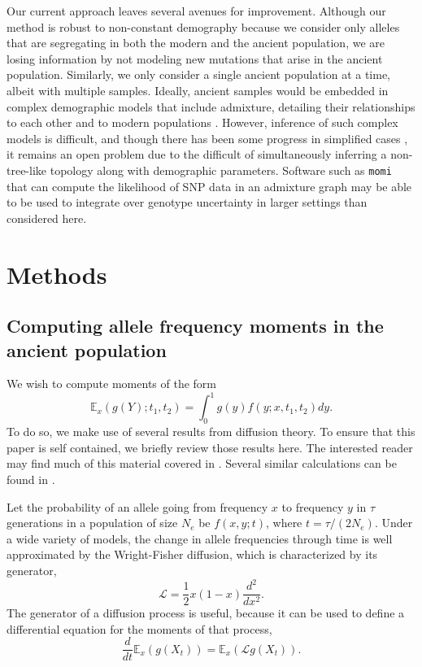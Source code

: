 \documentclass[11pt, oneside]{article}   	%
\begin{document}
Our current approach leaves several avenues for improvement. Although our method is robust to non-constant demography because we consider only alleles that are segregating in both the modern and the ancient population, we are losing information by not modeling new mutations that arise in the ancient population. Similarly, we only consider a single ancient population at a time, albeit with multiple samples. Ideally, ancient samples would be embedded in complex demographic models that include admixture, detailing their relationships to each other and to modern populations \citep{patterson2012ancient, lipson2017working}. However, inference of such complex models is difficult, and though there has been some progress in simplified cases \citep{lipson2014reconstructing, pickrell2012inference}, it remains an open problem due to the difficult of simultaneously inferring a non-tree-like topology along with demographic parameters. Software such as \texttt{momi} \citep{kamm2016efficient} that can compute the likelihood of SNP data in an admixture graph may be able to be used to integrate over genotype uncertainty in larger settings than considered here. 

\section{Methods}
\subsection{Computing allele frequency moments in the ancient population}
We wish to compute moments of the form
\begin{equation}
\mathbb{E}_x(g(Y); t_1, t_2) = \int_0^1 g(y) f(y; x, t_1, t_2)dy.
\label{cond_exp}
\end{equation}
To do so, we make use of several results from diffusion theory. To ensure that this paper is self contained, we briefly review those results here. The interested reader may find much of this material covered in \citet{ewens2012mathematical, karlin1981second}. Several similar calculations can be found in \citet{griffiths2003frequency}.

Let the probability of an allele going from frequency $x$ to frequency $y$ in $\tau$ generations in a population of size $N_e$ be $f(x,y; t)$, where $t = \tau/(2N_e)$. Under a wide variety of models, the change in allele frequencies through time is well approximated by the Wright-Fisher diffusion, which is characterized by its generator,
\[
\mathcal{L} = \frac{1}{2}x(1-x)\frac{d^2}{dx^2}.
\]
The generator of a diffusion process is useful, because it can be used to define a differential equation for the moments of that process,
\begin{equation}
\frac{d}{dt}\mathbb{E}_x(g(X_t)) = \mathbb{E}_x \left( \mathcal{L} g(X_t) \right).
\label{expectation_ode}
\end{equation}
\end{document}
